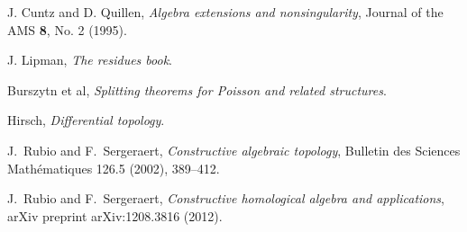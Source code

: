 \documentclass[english,letter paper,12pt,leqno]{article}
\theoremstyle{example}
\numberwithin{equation}{section}
\begin{document}
\begin{thebibliography}{BHLS03}
J. Cuntz and D. Quillen, \textsl{Algebra extensions and nonsingularity}, Journal of the AMS \textbf{8}, No. 2 (1995).

J. Lipman, \textsl{The residues book}.

Burszytn et al, \textsl{Splitting theorems for Poisson and related structures}.

Hirsch, \textsl{Differential topology}.

J.~Rubio and F.~Sergeraert, \textsl{Constructive algebraic topology}, Bulletin des Sciences Math\'ematiques 126.5 (2002), 389--412.

J.~Rubio and F.~Sergeraert, \textsl{Constructive homological algebra and applications}, arXiv preprint arXiv:1208.3816 (2012).

\end{thebibliography}
\end{document}
